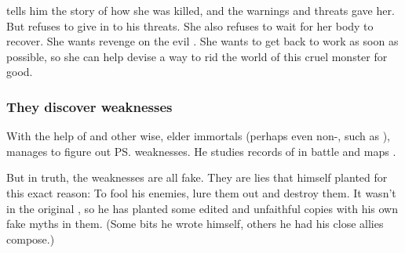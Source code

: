 \Urizeth{} tells him the story of how she was killed, and the warnings and threats \Ishnaruchaefir{} gave her. 
But \Urizeth{} refuses to give in to his threats. 
She also refuses to wait for her body to recover. 
She wants revenge on the evil \dragon. 
She wants to get back to work as soon as possible, so she can help \Teshrial{} devise a way to rid the world of this cruel monster for good. 






\subsubsection{They discover weaknesses}
With the help of \Urizeth{} and other wise, elder immortals (perhaps even non-\resphain, such as \quiljaaran), \Teshrial{} manages to figure out \ps{\Ishnaruchaefir} weaknesses. 
He studies records of \Ishnaruchaefir{} in battle and maps . 

But in truth, the weaknesses are all fake. 
They are lies that \Ishnaruchaefir{} himself planted for this exact reason: 
To fool his enemies, lure them out and destroy them. 
It wasn't in the original \emph{}, so he has planted some edited and unfaithful copies with his own fake myths in them.
(Some bits he wrote himself, others he had his close allies compose.) 

